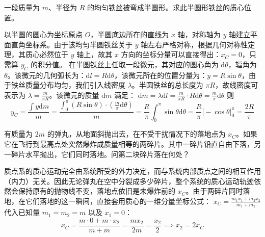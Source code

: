 \begin{example}
一段质量为 $m$、半径为 $R$ 的均匀铁丝被弯成半圆形。求此半圆形铁丝的质心位置。
\end{example}
\begin{solution}
以半圆的圆心为坐标原点 $O$，半圆底边所在的直线为 $x$ 轴，对称轴为 $y$ 轴建立平面直角坐标系。由于该均匀半圆铁丝关于 $y$ 轴左右严格对称，根据几何对称性定理，其质心必然位于 $y$ 轴上，故其 $x$ 方向的坐标分量可以直接得出：$x_C = 0$，只需算 $y_C$ 的积分值。
在半圆铁丝上任取一段微元，其对应的圆心角为 $\mathrm{d}\theta$，辐角为 $\theta$。该微元的几何弧长为：$\mathrm{d}l = R\mathrm{d}\theta$，该微元所在的位置分量为：$y = R\sin\theta$，由于铁丝质量分布均匀，我们引入线密度 $\lambda$。半圆铁丝的总长度为 $\pi R$，故线密度可表示为 $\lambda = \frac{m}{\pi R}$。该微元的质量 $\mathrm{d}m$ 满足： \(\mathrm{d}m = \lambda \mathrm{d}l = \frac{m}{\pi R} \cdot R\mathrm{d}\theta = \frac{m}{\pi}\mathrm{d}\theta\) 则
$$y_C = \frac{\int y \mathrm{d}m}{m} = \frac{\int_{0}^{\pi} (R\sin\theta) \cdot \left(\frac{m}{\pi}\mathrm{d}\theta\right)}{m}=\frac{R}{\pi} \int_{0}^{\pi} \sin\theta \mathrm{d}\theta = \frac{R}{\pi} \Big[ -\cos\theta \Big]_0^\pi = \frac{2R}{\pi}$$
\end{solution}

\begin{exercise}
有质量为 $2m$ 的弹丸，从地面斜抛出去，在不受干扰情况下的落地点为 $x_C$。如果它在飞行到最高点处突然爆炸成质量相等的两碎片。其中一碎片铅直自由下落，另一碎片水平抛出，它们同时落地。问第二块碎片落在何处？
\end{exercise}
\begin{solution}
质点系的质心运动完全由系统所受的外力决定，而与系统内部质点之间的相互作用（内力）无关。因此无论弹丸在空中分裂成多少碎片，整个系统的质心运动轨迹依然会保持原有的抛物线不变，落地点依旧是未爆炸前的 $x_C$。由于两碎片同时落地，在它们落地的这一瞬间，直接套用质心的一维分量坐标公式： \(x_C = \frac{m_1 x_1 + m_2 x_2}{m_1 + m_2}\) 代入已知量 $m_1 = m_2 = m$ 以及 $x_1 = 0$：$$x_C = \frac{m \cdot 0 + m \cdot x_2}{m + m} = \frac{m x_2}{2m} = \frac{x_2}{2}\implies x_2 = 2x_C$$
\end{solution}
